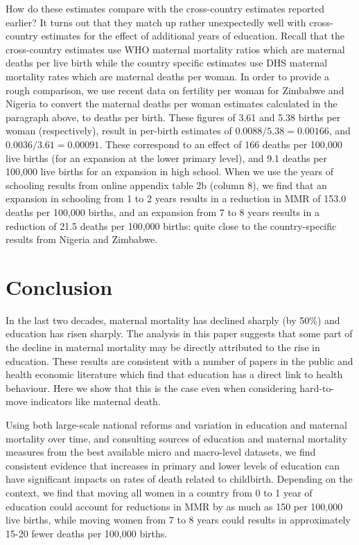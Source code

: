 \documentclass{article}[12pt,subeqn]
\begin{document}
\begin{spacing}{1.4}
How do these estimates compare with the cross-country estimates reported earlier? 
It turns out that they match up rather unexpectedly well with cross-country 
estimates for the effect of additional years of education. Recall that the 
cross-country estimates use WHO maternal mortality ratios which are maternal 
deaths per live birth while the country specific estimates use DHS maternal 
mortality rates which are maternal deaths per woman.  In order to provide a rough 
comparison, we use recent data \citep{CIA2012} on fertility per woman for Zimbabwe 
and Nigeria to convert the maternal deaths per woman estimates calculated in the 
paragraph above, to deaths per birth.  These figures of 3.61 and 5.38 births per 
woman (respectively), result in per-birth estimates of $0.0088/5.38=0.00166$, and 
$0.0036/3.61=0.00091$.  These correspond to an effect of 166 deaths per 100,000 
live births (for an expansion at the lower primary level), and 9.1 deaths per 
100,000 live births for an expansion in high school. When we use the years of 
schooling results from online appendix table 2b (column 8), we find that an 
expansion in schooling from 1 to 2 years results in a reduction in MMR of 153.0 
deaths per 100,000 births, and an expansion from 7 to 8 years results in a 
reduction of 21.5 deaths per 100,000 births: quite close to the country-specific 
results from Nigeria and Zimbabwe.

\section{Conclusion}
In the last two decades, maternal mortality has declined sharply (by 50\%) and 
education has risen sharply. The analysis in this paper suggests that some part 
of the decline in maternal mortality may be directly attributed to the rise in
education.  These results are consistent with a number of papers in the public
and health economic literature which find that education has a direct link to
health behaviour. Here we show that this is the case even when considering
hard-to-move indicators like maternal death.

Using both large-scale national reforms and variation in education and maternal
mortality over time, and consulting sources of education and maternal mortality
measures from the best available micro and macro-level datasets, we find
consistent evidence that increases in primary and lower levels of education can
have significant impacts on rates of death related to childbirth.  Depending on
the context, we find that moving all women in a country from 0 to 1 year of
education could account for reductions in MMR by as much as 150 per 100,000
live births, while moving women from 7 to 8 years could results in approximately
15-20 fewer deaths per 100,000 births.


\end{spacing}
\end{document}
